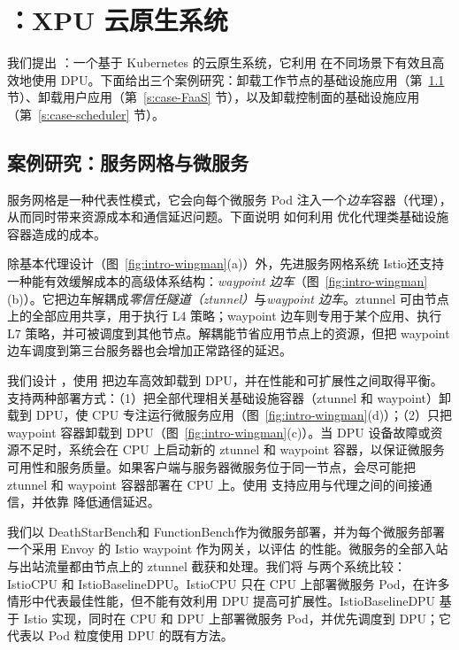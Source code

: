 \section{\sys：XPU 云原生系统}
\label{s:case}

我们提出 \sys：一个基于 Kubernetes 的云原生系统，它利用 \os 在不同场景下有效且高效地使用 DPU。下面给出三个案例研究：卸载工作节点的基础设施应用（第~\ref{s:case-mesh} 节）、卸载用户应用（第~\ref{s:case-FaaS} 节），以及卸载控制面的基础设施应用（第~\ref{s:case-scheduler} 节）。

\subsection{案例研究：服务网格与微服务}
\label{s:case-mesh}

服务网格是一种代表性模式，它会向每个微服务 Pod 注入一个\emph{边车}容器（代理），从而同时带来资源成本和通信延迟问题。下面说明 \sys 如何利用 \os 优化代理类基础设施容器造成的成本。

除基本代理设计（图~\ref{fig:intro-wingman}(a)）外，先进服务网格系统 Istio\cite{istio}还支持一种能有效缓解成本的高级体系结构：\emph{waypoint 边车}\cite{istio-ambient}（图~\ref{fig:intro-wingman}(b)）。它把边车解耦成\emph{零信任隧道（ztunnel）}与\emph{waypoint 边车}。ztunnel 可由节点上的全部应用共享，用于执行 L4 策略；waypoint 边车则专用于某个应用、执行 L7 策略，并可被调度到其他节点。解耦能节省应用节点上的资源，但把 waypoint 边车调度到第三台服务器也会增加正常路径的延迟。

我们设计 \mesh，使用 \os 把边车高效卸载到 DPU，并在性能和可扩展性之间取得平衡。\mesh 支持两种部署方式：（1）把全部代理相关基础设施容器（ztunnel 和 waypoint）卸载到 DPU，使 CPU 专注运行微服务应用（图~\ref{fig:intro-wingman}(d)）；（2）只把 waypoint 容器卸载到 DPU（图~\ref{fig:intro-wingman}(c)）。当 DPU 设备故障或资源不足时，系统会在 CPU 上启动新的 ztunnel 和 waypoint 容器，以保证微服务可用性和服务质量。如果客户端与服务器微服务位于同一节点，\mesh 会尽可能把 ztunnel 和 waypoint 容器部署在 CPU 上。\mesh 使用 \giptable 支持应用与代理之间的间接通信，并依靠 \gsocket 降低通信延迟。

我们以 DeathStarBench\cite{10.1145/3297858.3304013}和 FunctionBench\cite{kim2019practical}作为微服务部署，并为每个微服务部署一个采用 Envoy 的 Istio waypoint 作为网关，以评估 \mesh 的性能。微服务的全部入站与出站流量都由节点上的 ztunnel 截获和处理。我们将 \mesh 与两个系统比较：IstioCPU 和 IstioBaselineDPU。IstioCPU 只在 CPU 上部署微服务 Pod，在许多情形中代表最佳性能，但不能有效利用 DPU 提高可扩展性。IstioBaselineDPU 基于 Istio 实现，同时在 CPU 和 DPU 上部署微服务 Pod，并优先调度到 DPU；它代表以 Pod 粒度使用 DPU 的既有方法。

